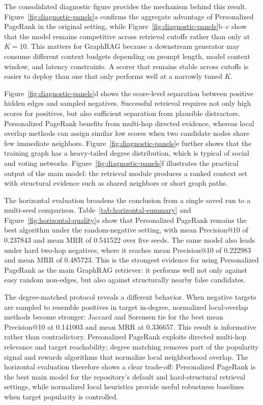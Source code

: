 \documentclass[10pt,twocolumn]{article}
\begin{document}
The consolidated diagnostic figure provides the mechanism behind this result. Figure~\ref{fig:diagnostic-panels}a confirms the aggregate advantage of Personalized PageRank in the original setting, while Figure~\ref{fig:diagnostic-panels}b--c show that the model remains competitive across retrieval cutoffs rather than only at $K=10$. This matters for GraphRAG because a downstream generator may consume different context budgets depending on prompt length, model context window, and latency constraints. A scorer that remains stable across cutoffs is easier to deploy than one that only performs well at a narrowly tuned $K$.

Figure~\ref{fig:diagnostic-panels}d shows the score-level separation between positive hidden edges and sampled negatives. Successful retrieval requires not only high scores for positives, but also sufficient separation from plausible distractors. Personalized PageRank benefits from multi-hop directed evidence, whereas local overlap methods can assign similar low scores when two candidate nodes share few immediate neighbors. Figure~\ref{fig:diagnostic-panels}e further shows that the training graph has a heavy-tailed degree distribution, which is typical of social and voting networks. Figure~\ref{fig:diagnostic-panels}f illustrates the practical output of the main model: the retrieval module produces a ranked context set with structural evidence such as shared neighbors or short graph paths.

The horizontal evaluation broadens the conclusion from a single saved run to a multi-seed comparison. Table~\ref{tab:horizontal-summary} and Figure~\ref{fig:horizontal-quality}a show that Personalized PageRank remains the best algorithm under the random-negative setting, with mean Precision@10 of 0.237843 and mean MRR of 0.541522 over five seeds. The same model also leads under hard two-hop negatives, where it reaches mean Precision@10 of 0.222983 and mean MRR of 0.485723. This is the strongest evidence for using Personalized PageRank as the main GraphRAG retriever: it performs well not only against easy random non-edges, but also against structurally nearby false candidates.

The degree-matched protocol reveals a different behavior. When negative targets are sampled to resemble positives in target in-degree, normalized local-overlap methods become stronger: Jaccard and Sorensen tie for the best mean Precision@10 at 0.141003 and mean MRR at 0.336657. This result is informative rather than contradictory. Personalized PageRank exploits directed multi-hop relevance and target reachability; degree matching removes part of the popularity signal and rewards algorithms that normalize local neighborhood overlap. The horizontal evaluation therefore shows a clear trade-off: Personalized PageRank is the best main model for the repository's default and hard-structural retrieval settings, while normalized local heuristics provide useful robustness baselines when target popularity is controlled.
\end{document}

